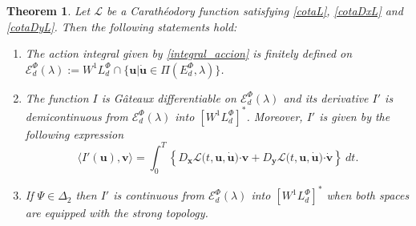 \documentclass[twoside]{article}
\newtheorem{thm}{Theorem}[section]
\theoremstyle{remark}
\newcommand{\lphi}{L^{\Phi}}
\newcommand{\ephi}{E^{\Phi}}
\newcommand{\wphi}{W^{1}\lphi}
\newcommand{\domi}{\mathcal{E}^{\Phi}_d(\lambda)}
\renewcommand{\b}[1]{\boldsymbol{#1}}
\newcommand{\ccdot}{\b{\cdot}}
\begin{document}
\begin{thm}\label{teorema_acotacion}
Let $\mathcal{L}$ be a Carath\'eodory function satisfying \eqref{cotaL}, \eqref{cotaDxL} and \eqref{cotaDyL}. 
Then the following statements hold:
\begin{enumerate}
\item \label{T1item1} \label{A1} The action integral given by \eqref{integral_accion}
is finitely defined on $\domi:=W^{1}\lphi_d\cap\{\b{u}|\b{\dot{u}}\in\Pi(\ephi_d,\lambda)\}$.

\item\label{T1item3} The function  $I$ is G\^ateaux differentiable on $\domi$ and  its derivative $I'$ is demicontinuous from $\domi$  into $\left[\wphi_d \right]^*$. Moreover, $I'$ is given by the following expression
\begin{equation}\label{DerAccion}
\langle  I'(\b{u}),\b{v}\rangle= \int_0^T \left\{D_{\b{x}}\mathcal{L}\big(t,\b{u},\b{\dot{u}}\big)\ccdot \b{v}+ D_{\b{y}}\mathcal{L}\big(t,\b{u},\b{\dot{u}}\big)\ccdot\b{\dot{v}}\right\} \ dt.
\end{equation}

\item\label{T1item4}  If  $\Psi \in \Delta_2$ then 
  $I'$ is continuous from $\domi$ into $\left[\wphi_d\right]^*$ when both spaces are equipped with the strong topology.
\end{enumerate}
\end{thm}
\end{document}
